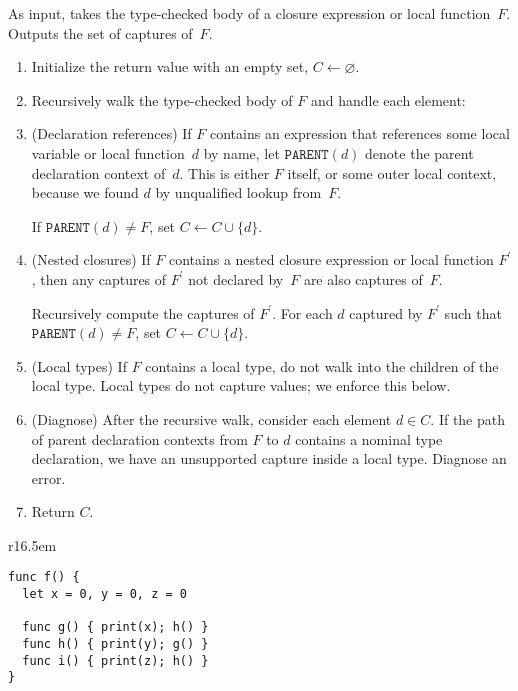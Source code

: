 \documentclass[../generics]{subfiles}
\begin{document}
\begin{algorithm}\label{closure captures algorithm}
As input, takes the type-checked body of a closure expression or local function~$F$. Outputs the set of captures of~$F$.
\begin{enumerate}
\item Initialize the return value with an empty set, $C\leftarrow\varnothing$.
\item Recursively walk the type-checked body of $F$ and handle each element:
\item (Declaration references) If $F$ contains an expression that references some local variable or local function~$d$ by name, let $\texttt{PARENT}(d)$ denote the parent declaration context of~$d$. This is either $F$ itself, or some outer local context, because we found $d$ by unqualified lookup from~$F$.

If $\texttt{PARENT}(d)\neq F$, set $C\leftarrow C\cup\{d\}$.
\item (Nested closures) If $F$ contains a nested closure expression or local function $F^\prime$, then any captures of $F^\prime$ not declared by~$F$ are also captures of~$F$.

Recursively compute the captures of $F^\prime$. For each $d$ captured by $F^\prime$ such that $\texttt{PARENT}(d)\neq F$, set $C\leftarrow C\cup\{d\}$.

\item (Local types) If $F$ contains a local type, do not walk into the children of the local type. Local types do not capture values; we enforce this below.

\item (Diagnose) After the recursive walk, consider each element $d\in C$. If the path of parent declaration contexts from $F$ to $d$ contains a nominal type declaration, we have an unsupported capture inside a local type. Diagnose an error.

\item Return $C$.
\end{enumerate}
\end{algorithm}

\begin{wrapfigure}[9]{r}{16.5em}
\begin{minipage}{16.5em}
\begin{Verbatim}
func f() {
  let x = 0, y = 0, z = 0

  func g() { print(x); h() }
  func h() { print(y); g() }
  func i() { print(z); h() }
}
\end{Verbatim}
\end{minipage}
\end{wrapfigure}
\end{document}
